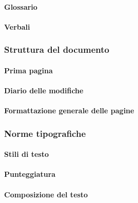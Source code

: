 \paragraph{\DDP}

\paragraph{Glossario}

\paragraph{\MU}

\paragraph{Verbali}

\subsubsection{Struttura del documento}

\paragraph{Prima pagina}

\paragraph{Diario delle modifiche}

\paragraph{Formattazione generale delle pagine}

\subsubsection{Norme tipografiche}

\paragraph{Stili di testo}

\paragraph{Punteggiatura}

\paragraph{Composizione del testo}

